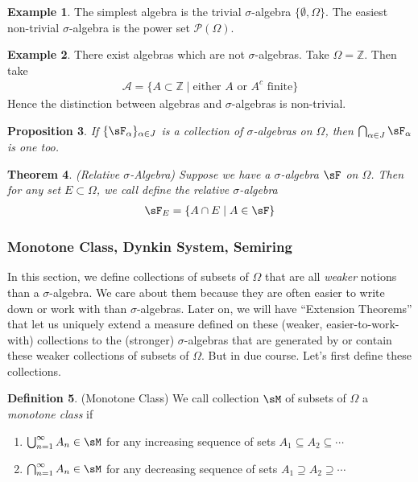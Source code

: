 \documentclass[12pt]{article}
\theoremstyle{plain}
\newtheorem{thm}{Theorem}[section]
\newtheorem{prop}[thm]{Proposition}
\theoremstyle{definition}
\newtheorem{defn}[thm]{Definition}
\newtheorem{ex}[thm]{Example}
\theoremstyle{remark}
\newcommand{\ninf}{_{n=1}^\infty}
\begin{document}
\begin{ex}
The simplest algebra is the trivial $\sigma$-algebra $\{\emptyset, \Omega\}$.
The easiest non-trivial $\sigma$-algebra is the power set
$\mathscr{P}(\Omega)$.
\end{ex}

\begin{ex}
There exist algebras which are not $\sigma$-algebras. Take
$\Omega=\mathbb{Z}$. Then take
\begin{align*}
  \mathscr{A}
  = \{A\subset \mathbb{Z} \; |\; \text{either $A$ or $A^c$ finite}\}
\end{align*}
Hence the distinction between algebras and $\sigma$-algebras is
non-trivial.
\end{ex}

\begin{prop}
\label{prop:sigma-intersection}
If $\{\sF_\alpha\}_{\alpha\in J}$ is a collection of
$\sigma$-algebras on $\Omega$, then $\bigcap_{\alpha\in J} \sF_\alpha$
is one too.
\end{prop}


\begin{thm}\emph{(Relative $\sigma$-Algebra)}
\label{thm:relsigal}
Suppose we have a $\sigma$-algebra $\sF$ on $\Omega$. Then for any set
$E\subset \Omega$, we call define the
\emph{relative $\sigma$-algebra}
\begin{align*}
  \sF_E = \{ A \cap E \; | \; A \in \sF\}
\end{align*}
\end{thm}

\subsubsection{Monotone Class, Dynkin System, Semiring}

In this section, we define collections of subsets of $\Omega$ that are
all \emph{weaker} notions than a $\sigma$-algebra.  We care about them
because they are often easier to write down or work with than
$\sigma$-algebras. Later on, we will have ``Extension Theorems'' that
let us uniquely extend a measure defined on these (weaker,
easier-to-work-with) collections to the (stronger) $\sigma$-algebras
that are generated by or contain these weaker collections of subsets of
$\Omega$. But in due course. Let's first define these collections.

\begin{defn}(Monotone Class)
We call collection $\sM$ of subsets of $\Omega$ a
\emph{monotone class} if
\begin{enumerate}
  \item $\bigcup\ninf A_n \in \sM$ for any increasing sequence of sets
    $A_1\subseteq A_2\subseteq\cdots$
  \item $\bigcap\ninf A_n \in \sM$ for any decreasing sequence of sets
    $A_1\supseteq A_2\supseteq\cdots$
\end{enumerate}
\end{defn}
\end{document}
